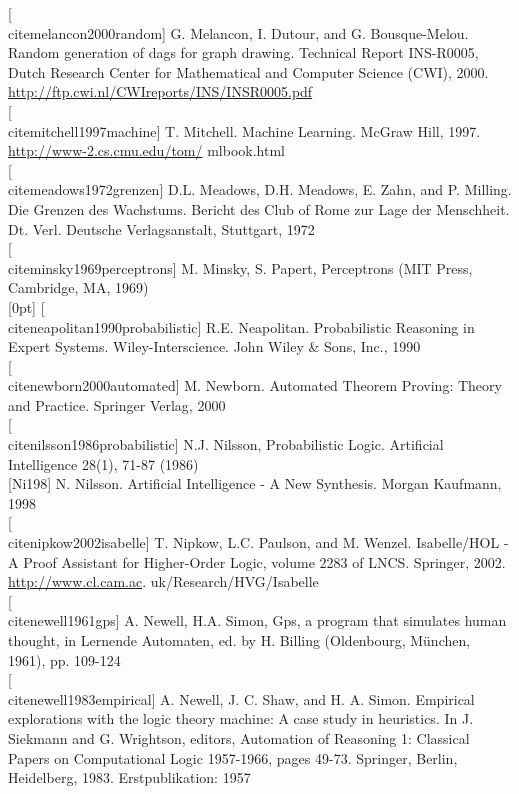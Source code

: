 \documentclass[10pt]{book}
\begin{document}
[\\cite{melancon2000random}] G. Melancon, I. Dutour, and G. Bousque-Melou. Random generation of dags for graph drawing. Technical Report INS-R0005, Dutch Research Center for Mathematical and Computer Science (CWI), 2000. \href{http://ftp.cwi.nl/CWIreports/INS/INSR0005.pdf}{http://ftp.cwi.nl/CWIreports/INS/INSR0005.pdf}\\[0pt]
[\\cite{mitchell1997machine}] T. Mitchell. Machine Learning. McGraw Hill, 1997. \href{http://www-2.cs.cmu.edu/tom/}{http://www-2.cs.cmu.edu/tom/} mlbook.html\\[0pt]
[\\cite{meadows1972grenzen}] D.L. Meadows, D.H. Meadows, E. Zahn, and P. Milling. Die Grenzen des Wachstums. Bericht des Club of Rome zur Lage der Menschheit. Dt. Verl. Deutsche Verlagsanstalt, Stuttgart, 1972\\[0pt]
[\\cite{minsky1969perceptrons}] M. Minsky, S. Papert, Perceptrons (MIT Press, Cambridge, MA, 1969)\\
[0pt]
[\\cite{neapolitan1990probabilistic}] R.E. Neapolitan. Probabilistic Reasoning in Expert Systems. Wiley-Interscience. John Wiley \& Sons, Inc., 1990\\[0pt]
[\\cite{newborn2000automated}] M. Newborn. Automated Theorem Proving: Theory and Practice. Springer Verlag, 2000\\[0pt]
[\\cite{nilsson1986probabilistic}] N.J. Nilsson, Probabilistic Logic. Artificial Intelligence 28(1), 71-87 (1986)\\[0pt]
[Ni198] N. Nilsson. Artificial Intelligence - A New Synthesis. Morgan Kaufmann, 1998\\[0pt]
[\\cite{nipkow2002isabelle}] T. Nipkow, L.C. Paulson, and M. Wenzel. Isabelle/HOL - A Proof Assistant for Higher-Order Logic, volume 2283 of LNCS. Springer, 2002. \href{http://www.cl.cam.ac}{http://www.cl.cam.ac}. uk/Research/HVG/Isabelle\\[0pt]
[\\cite{newell1961gps}] A. Newell, H.A. Simon, Gps, a program that simulates human thought, in Lernende Automaten, ed. by H. Billing (Oldenbourg, München, 1961), pp. 109-124\\[0pt]
[\\cite{newell1983empirical}] A. Newell, J. C. Shaw, and H. A. Simon. Empirical explorations with the logic theory machine: A case study in heuristics. In J. Siekmann and G. Wrightson, editors, Automation of Reasoning 1: Classical Papers on Computational Logic 1957-1966, pages 49-73. Springer, Berlin, Heidelberg, 1983. Erstpublikation: 1957\\[0pt]
\end{document}
